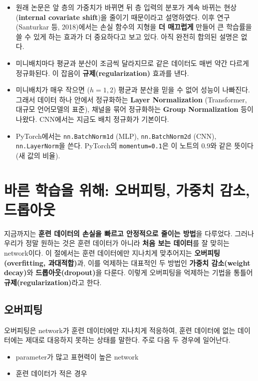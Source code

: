 \documentclass[11pt,a4paper]{article}
\begin{document}
\begin{remarkbox}
\begin{itemize}[leftmargin=1.5em]
\item 원래 논문은 앞 층의 가중치가 바뀌면 뒤 층 입력의 분포가 계속 바뀌는 현상
(\textbf{internal covariate shift})을 줄이기 때문이라고 설명하였다.
이후 연구 (Santurkar 등, 2018)에서는 손실 함수의 지형을 \textbf{더 매끄럽게} 만들어
큰 학습률을 쓸 수 있게 하는 효과가 더 중요하다고 보고 있다. 아직 완전히 합의된 설명은 없다.
\item 미니배치마다 평균과 분산이 조금씩 달라지므로 같은 데이터도 매번 약간 다르게 정규화된다.
이 잡음이 \textbf{규제(regularization)} 효과를 낸다.
\item 미니배치가 매우 작으면 ($h=1, 2$) 평균과 분산을 믿을 수 없어 성능이 나빠진다.
그래서 데이터 하나 안에서 정규화하는 \textbf{Layer Normalization}
(Transformer, 대규모 언어모델의 표준), 채널을 묶어 정규화하는 \textbf{Group Normalization} 등이 나왔다.
CNN에서는 지금도 배치 정규화가 기본이다.
\item PyTorch에서는 \texttt{nn.BatchNorm1d} (MLP), \texttt{nn.BatchNorm2d} (CNN), \texttt{nn.LayerNorm}을 쓴다.
PyTorch의 \texttt{momentum=0.1}은 이 노트의 $0.9$와 같은 뜻이다 (새 값의 비율).
\end{itemize}
\end{remarkbox}

\section{바른 학습을 위해: 오버피팅, 가중치 감소, 드롭아웃}\label{sec:reg}

지금까지는 \textbf{훈련 데이터의 손실을 빠르고 안정적으로 줄이는 방법}을 다루었다.
그러나 우리가 정말 원하는 것은 훈련 데이터가 아니라 \textbf{처음 보는 데이터}를 잘 맞히는 network이다.
이 절에서는 훈련 데이터에만 지나치게 맞추어지는 \textbf{오버피팅(overfitting, 과대적합)}과,
이를 억제하는 대표적인 두 방법인 \textbf{가중치 감소(weight decay)}와 \textbf{드롭아웃(dropout)}을 다룬다.
이렇게 오버피팅을 억제하는 기법을 통틀어 \textbf{규제(regularization)}라고 한다.

\subsection{오버피팅}\label{sec:overfit}

오버피팅은 network가 훈련 데이터에만 지나치게 적응하여,
훈련 데이터에 없는 데이터에는 제대로 대응하지 못하는 상태를 말한다.
주로 다음 두 경우에 일어난다.
\begin{itemize}[leftmargin=1.8em]
\item parameter가 많고 표현력이 높은 network
\item 훈련 데이터가 적은 경우
\end{itemize}
\end{document}

